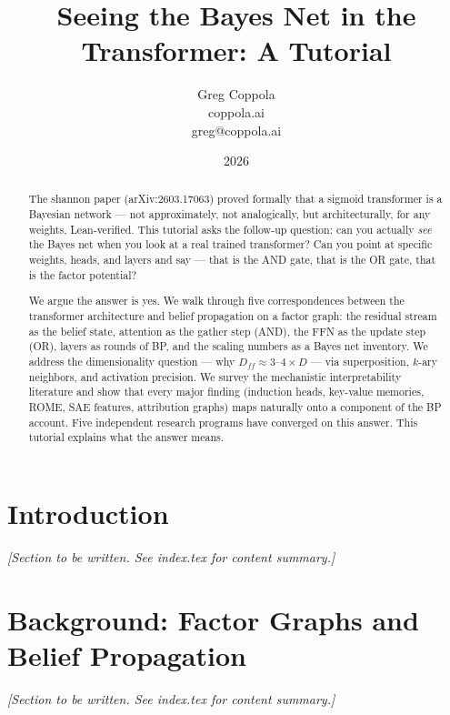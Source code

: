 \documentclass[11pt,letterpaper]{article}
\title{\textbf{Seeing the Bayes Net in the Transformer: A Tutorial}}
\author{Greg Coppola\\coppola.ai\\greg@coppola.ai}
\date{2026}
\begin{document}
\maketitle

\begin{abstract}
The shannon paper (arXiv:2603.17063) proved formally that a sigmoid transformer is a
Bayesian network --- not approximately, not analogically, but architecturally, for any
weights, Lean-verified. This tutorial asks the follow-up question: can you actually
\emph{see} the Bayes net when you look at a real trained transformer? Can you point at
specific weights, heads, and layers and say --- that is the AND gate, that is the OR
gate, that is the factor potential?

We argue the answer is yes. We walk through five correspondences between the transformer
architecture and belief propagation on a factor graph: the residual stream as the belief
state, attention as the gather step (AND), the FFN as the update step (OR), layers as
rounds of BP, and the scaling numbers as a Bayes net inventory. We address the
dimensionality question --- why $D_{ff} \approx 3$--$4 \times D$ --- via superposition,
$k$-ary neighbors, and activation precision. We survey the mechanistic interpretability
literature and show that every major finding (induction heads, key-value memories, ROME,
SAE features, attribution graphs) maps naturally onto a component of the BP account.
Five independent research programs have converged on this answer. This tutorial explains
what the answer means.
\end{abstract}

\tableofcontents
\newpage

\section{Introduction}
\textit{[Section to be written. See index.tex for content summary.]}

\section{Background: Factor Graphs and Belief Propagation}
\textit{[Section to be written. See index.tex for content summary.]}
\end{document}
